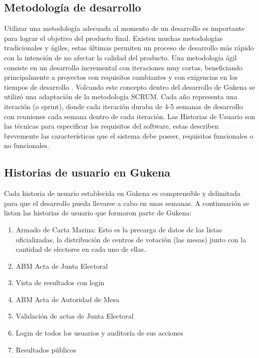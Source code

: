 \subsection{Metodología de desarrollo}
Utilizar una metodología adecuada al momento de un desarrollo es importante para lograr el objetivo del producto final. Existen muchas metodologías tradicionales y ágiles, estas últimas permiten un proceso de desarrollo más rápido con la intención de no afectar la calidad del producto. Una metodología ágil consiste en un desarrollo incremental con iteraciones muy cortas, beneficiando principalmente a proyectos con requisitos cambiantes y con exigencias en los tiempos
de desarrollo \cite{canos2012metodologias}. 
Volcando este concepto dentro del desarrollo de Gukena se utilizó una adaptación de la metodología SCRUM. Cada año representa una iteración (o sprint), donde cada iteración duraba de 4-5 semanas de desarrollo con reuniones cada semana dentro de cada iteración. Las Historias de Usuario son las técnicas para especificar los requisitos del software, estas describen brevemente las características que el sistema debe poseer, requisitos funcionales o no funcionales.
\subsection{Historias de usuario en Gukena}
 Cada historia de usuario establecida en Gukena es comprensible y delimitada para que el desarrollo pueda llevarse a cabo en unas semanas. A continuación se listan las historias de usuario que formaron parte de Gukena:
 \begin{enumerate}
     \item Armado de Carta Marina: Esto es la precarga de datos de las listas oficializadas, la distribución de centros de votación (las mesas) junto con la cantidad de electores en cada uno de ellas.
     \item ABM Acta de Junta Electoral
     \item Vista de resultados con login
     \item ABM Acta de Autoridad de Mesa
     \item Validación de actas de Junta Electoral
     \item Login de todos los usuarios y auditoría de sus acciones
     \item Resultados públicos
 \end{enumerate}
 
